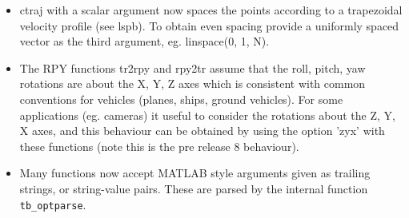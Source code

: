 \documentclass[a4paper]{report}
\begin{document}
\begin{itemize}
\item ctraj with a scalar argument now spaces the points according to a trapezoidal velocity profile (see lspb). To obtain even spacing provide a uniformly spaced vector as the third argument, eg. linspace(0, 1, N).
\item The RPY functions tr2rpy and rpy2tr assume that the roll, pitch, yaw rotations are about the X, Y, Z axes which is consistent with common conventions for vehicles (planes, ships, ground vehicles). For some applications (eg. cameras) it useful to consider the rotations about the Z, Y, X axes, and this behaviour can be obtained by using the option 'zyx' with these functions (note this is the pre release 8 behaviour).
\item Many functions now accept MATLAB style arguments given as trailing strings, or string-value pairs.  These are parsed by the internal
function \texttt{tb\_optparse}.
\end{itemize}
\end{document}
